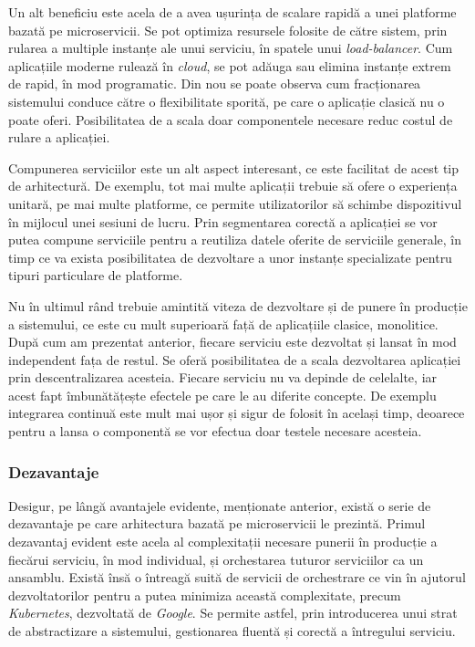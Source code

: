Un alt beneficiu este acela de a avea ușurința de scalare rapidă a unei platforme bazată pe microservicii. Se pot optimiza resursele folosite de către sistem, prin rularea a multiple instanțe ale unui serviciu, în spatele unui \textit{load-balancer}. Cum aplicațiile moderne rulează în \textit{cloud}, se pot adăuga sau elimina instanțe extrem de rapid, în mod programatic. Din nou se poate observa cum fracționarea sistemului conduce către o flexibilitate sporită, pe care o aplicație clasică nu o poate oferi. Posibilitatea de a scala doar componentele necesare reduc costul de rulare a aplicației.

Compunerea serviciilor este un alt aspect interesant, ce este facilitat de acest tip de arhitectură. De exemplu, tot mai multe aplicații trebuie să ofere o experiența unitară, pe mai multe platforme, ce permite utilizatorilor să schimbe dispozitivul în mijlocul unei sesiuni de lucru. Prin segmentarea corectă a aplicației se vor putea compune serviciile pentru a reutiliza datele oferite de serviciile generale, în timp ce va exista posibilitatea de dezvoltare a unor instanțe specializate pentru tipuri particulare de platforme. 

Nu în ultimul rând trebuie amintită viteza de dezvoltare și de punere în producție a sistemului, ce este cu mult superioară față de aplicațiile clasice, monolitice. După cum am prezentat anterior, fiecare serviciu este dezvoltat și lansat în mod independent fața de restul. Se oferă posibilitatea de a scala dezvoltarea aplicației prin descentralizarea acesteia. Fiecare serviciu nu va depinde de celelalte, iar acest fapt îmbunătățește efectele pe care le au diferite concepte. De exemplu integrarea continuă este mult mai ușor și sigur de folosit în același timp, deoarece pentru a lansa o componentă se vor efectua doar testele necesare acesteia. 

\subsubsection{Dezavantaje}

Desigur, pe lângă avantajele evidente, menționate anterior, există o serie de dezavantaje pe care arhitectura bazată pe microservicii le prezintă\cite{onmicro}. Primul dezavantaj evident este acela al complexitații necesare punerii în producție a fiecărui serviciu, în mod individual, și orchestarea tuturor serviciilor ca un ansamblu. Există însă o întreagă suită de servicii de orchestrare ce vin în ajutorul dezvoltatorilor pentru a putea minimiza această complexitate, precum  \textit{Kubernetes}, dezvoltată de \textit{Google}. Se permite astfel, prin introducerea unui strat de abstractizare a sistemului, gestionarea fluentă și corectă a întregului serviciu. \cite{kubernetes}

